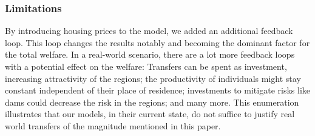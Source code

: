 \documentclass[10pt,a4paper]{article}
\begin{document}
\subsubsection{Limitations}
By introducing housing prices to the model, we added an additional feedback loop. This loop changes the results notably and becoming the dominant factor for the total welfare. In a real-world scenario, there are a lot more feedback loops with a potential effect on the welfare: Transfers can be spent as investment, increasing attractivity of the regions; the productivity of individuals might stay constant independent of their place of residence; investments to mitigate risks like dams could decrease the risk in the regions; and many more. This enumeration illustrates that our models, in their current state, do not suffice to justify real world transfers of the magnitude mentioned in this paper.
\end{document}
